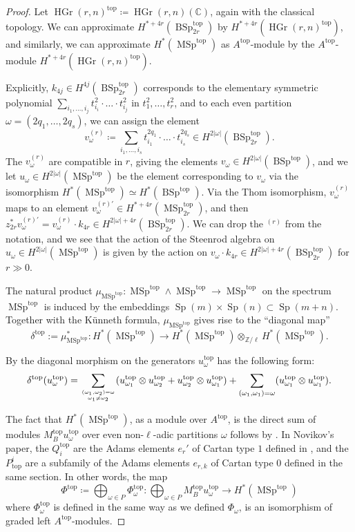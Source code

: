 \documentclass[10pt]{amsart}
\theoremstyle{definition}
\theoremstyle{plain}
\numberwithin{equation}{section}
\newcommand{\0}{\emptyset}
\newcommand{\C}{{\mathbb C}}
\newcommand{\Z}{{\mathbb Z}}
\newcommand{\MSp}{{\operatorname{MSp}}}
\newcommand{\BSp}{{\operatorname{BSp}}}
\newcommand{\Sp}{{\operatorname{Sp}}}
\newcommand{\HGr}{{\operatorname{HGr}}}
\renewcommand{\top}{{\operatorname{top}}}
\begin{document}
\begin{proof}
 Let $\HGr(r,n)^\top \coloneqq \HGr(r,n)(\C)$, again with the classical topology. We can approximate $H^{*+4r}(\BSp_{2r}^\top)$ by $H^{*+4r}(\HGr(r,n)^\top)$, and similarly, we can approximate $H^*(\MSp^\top)$ as $A^\top$-module by the $A^\top$-module $H^{*+4r}(\HGr(r,n)^\top)$.
 
Explicitly, $k_{4j}\in H^{4j}(\BSp^\top_{2r})$ corresponds to the elementary symmetric polynomial $\sum_{i_1,\ldots, i_j}t_{i_i}^2 \cdot \ldots \cdot t_{i_j}^2$ in $t_1^2,\ldots, t_r^2$, and to each even partition $\omega=(2q_1,\ldots,2q_s)$, we can assign the element
    $$v^{(r)}_{\omega}\coloneqq \sum_{i_1,\ldots, i_s}t_{i_1}^{2q_1}\cdot \ldots \cdot t_{i_s}^{2q_s}\in
 H^{2|\omega|}(\BSp_{2r}^\top).$$
The $v^{(r)}_{\omega}$ are compatible in $r$, giving the elements $v_\omega\in H^{2|\omega|}(\BSp^\top)$, and we let $u_\omega\in H^{2|\omega|}(\MSp^\top)$ be the element corresponding to $v_\omega$ via the isomorphism $H^*(\MSp^\top)\simeq H^*(\BSp^\top)$. Via the Thom isomorphism, $v^{(r)}_\omega$ maps to an element $v_\omega^{(r)'}\in H^{*+4r}(\MSp_{2r}^\top)$, and then $z_{2r}^*v_\omega^{(r)'}=v^{(r)}_{\omega}\cdot k_{4r}\in
 H^{2|\omega|+4r}(\BSp_{2r}^\top)$. We can drop the ${}^{(r)}$ from the notation, and we see that the action of the Steenrod algebra on  $u_\omega\in H^{2|\omega|}(\MSp^\top)$ is given by the action on $v_{\omega}\cdot k_{4r}\in
 H^{2|\omega|+4r}(\BSp_{2r}^\top)$ for $r\gg0$.
    
 The natural product $\mu_{\MSp^\top}: \MSp^\top\wedge \MSp^\top\to \MSp^\top$ on the spectrum $\MSp^\top$ is induced by the embeddings $\Sp(m)\times \Sp(n) \subset \Sp(m+n)$. Together with the K\"unneth formula, $\mu_{\MSp^\top}$ gives rise to the ``diagonal map''
 \[
 \delta^\top:=\mu_{\MSp^\top}^*:H^*(\MSp^\top)\to H^*(\MSp^\top)\otimes_{\Z/\ell}H^*(\MSp^\top).
 \] 
 
   By \cite[Lemma 7]{Thomcompl} the diagonal morphism on the generators $u_{\omega}^{\top}$ has the following form:
    \begin{equation}
    \label{eq:comultiplication}
        \delta^\top(u_{\omega}^{\top})= \sum_{{(\omega_1,\omega_2)=\omega} \atop{\omega_1 \neq \omega_2}}(u_{\omega_1}^{\top} \otimes u_{\omega_2}^{\top}+u_{\omega_2}^{\top}\otimes u_{\omega_1}^{\top}) + \sum_{(\omega_1,\omega_1)=\omega}(u_{\omega_1}^{\top}\otimes u_{\omega_1}^{\top}).
    \end{equation}
    
    The fact that $H^*(\MSp^{\top})$, as a module over $A^{\top}$, is the direct sum of modules $M_B^{\top}u_{\omega}^{\top}$ over even non-$\ell$-adic partitions $\omega$ follows by \cite[Lemma 4]{Thomcompl}. In Novikov's paper, the $Q_i^{\top}$ are the Adams elements $e_r'$ of Cartan type $1$ defined in \cite[Section 2.2]{Thomcompl}, and the $P_{\top}^i$ are a subfamily of the Adams elements $e_{r,k}$ of Cartan type $0$ defined in the same section. In other words, the map
    $$\Phi^{\top} \coloneqq \bigoplus_{\omega \in P} \Phi_{\omega}^{\top}:\bigoplus_{\omega \in P}M_B^{\top}u_{\omega}^{\top}\to H^*(\MSp^{\top})$$
    where $\Phi_{\omega}^{\top}$ is defined in the same way as we defined $\Phi_{\omega}$, is an isomorphism of graded left  $A^{\top}$-modules.


\end{proof}
\end{document}
